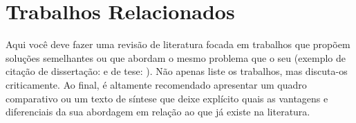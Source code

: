 \section{Trabalhos Relacionados}
\label{sec:trabalhos_relacionados}

Aqui você deve fazer uma revisão de literatura focada em trabalhos que propõem soluções semelhantes ou que abordam o mesmo problema que o seu (exemplo de citação de dissertação: \cite{dissertacao_exemplo} e de tese: \cite{tese_exemplo}). Não apenas liste os trabalhos, mas discuta-os criticamente. Ao final, é altamente recomendado apresentar um quadro comparativo ou um texto de síntese que deixe explícito quais as vantagens e diferenciais da sua abordagem em relação ao que já existe na literatura.
